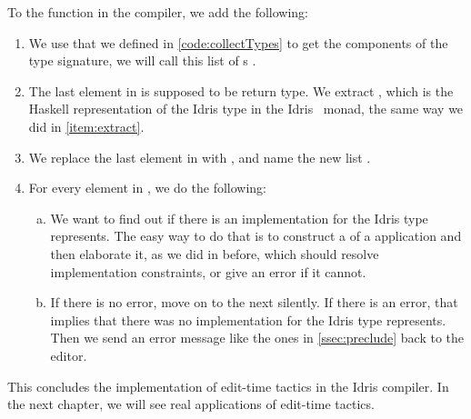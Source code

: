 To the  function in the compiler, we add the following:
\begin{enumerate}
  \item We use  that we defined in \autoref{code:collectTypes} to get the components of the type signature, we will call this list of s .
  \item The last element in  is supposed to be return type. We
    extract , which is the Haskell representation of the Idris
    type in the Idris \Elab\ monad, the same way we did in
    \autoref{item:extract}.
  \item We replace the last element in  with ,
    and name the new list .
  \item For every element  in , we do the following:
    \begin{enumerate}[(a)]
      \item We want to find out if there is an  implementation
        for the Idris type  represents. The easy way to do that is to
        construct a  of a  application and then
        elaborate it, as we did in \label{item:fromEditor} before, which should
        resolve implementation constraints, or give an error if it cannot.
      \item If there is no error, move on to the next  silently.
        If there is an error, that implies that there was no 
        implementation for the Idris type  represents. Then we send an
        error message like the ones in \autoref{ssec:preclude} back to the editor.
    \end{enumerate}
\end{enumerate}

This concludes the implementation of edit-time tactics in the Idris compiler.
In the next chapter, we will see real applications of edit-time tactics.
